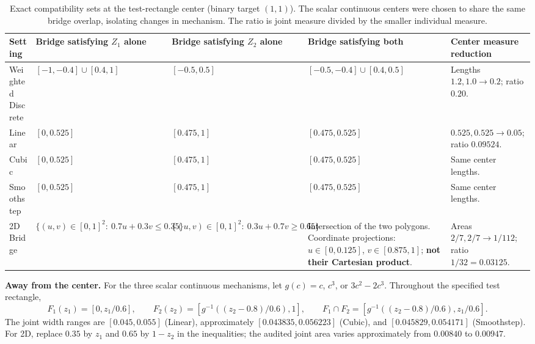 \documentclass[11pt]{article}
\begin{document}
\begin{table}[h!]
\centering\small\renewcommand{\arraystretch}{1.5}
\begin{tabular}{p{25mm}p{50mm}p{50mm}p{58mm}p{41mm}}
\toprule
Setting & Bridge satisfying $Z_1$ alone & Bridge satisfying $Z_2$ alone & Bridge satisfying both & Center measure reduction \\
\midrule
Weighted Discrete & $[-1,-0.4]\cup[0.4,1]$ & $[-0.5,0.5]$ & $[-0.5,-0.4]\cup[0.4,0.5]$ & Lengths $1.2,1.0\to0.2$; ratio $0.20$. \\
Linear & $[0,0.525]$ & $[0.475,1]$ & $[0.475,0.525]$ & $0.525,0.525\to0.05$; ratio $0.09524$. \\
Cubic & $[0,0.525]$ & $[0.475,1]$ & $[0.475,0.525]$ & Same center lengths. \\
Smoothstep & $[0,0.525]$ & $[0.475,1]$ & $[0.475,0.525]$ & Same center lengths. \\
2D Bridge & $\{(u,v)\in[0,1]^2:\ 0.7u+0.3v\leq0.35\}$ & $\{(u,v)\in[0,1]^2:\ 0.3u+0.7v\geq0.65\}$ & Intersection of the two polygons. Coordinate projections: $u\in[0,0.125]$, $v\in[0.875,1]$; \textbf{not their Cartesian product}. & Areas $2/7,2/7\to1/112$; ratio $1/32=0.03125$. \\
\bottomrule
\end{tabular}
\caption{Exact compatibility sets at the test-rectangle center (binary target $(1,1)$). The scalar continuous centers were chosen to share the same bridge overlap, isolating changes in mechanism. The ratio is joint measure divided by the smaller individual measure.}
\end{table}

\textbf{Away from the center.} For the three scalar continuous mechanisms, let $g(c)=c$, $c^3$, or $3c^2-2c^3$. Throughout the specified test rectangle,
\[
F_1(z_1)=[0,z_1/0.6],\qquad
F_2(z_2)=[g^{-1}((z_2-0.8)/0.6),1],\qquad
F_1\cap F_2=[g^{-1}((z_2-0.8)/0.6),z_1/0.6].
\]
The joint width ranges are $[0.045,0.055]$ (Linear), approximately $[0.043835,0.056223]$ (Cubic), and $[0.045829,0.054171]$ (Smoothstep). For 2D, replace $0.35$ by $z_1$ and $0.65$ by $1-z_2$ in the inequalities; the audited joint area varies approximately from $0.00840$ to $0.00947$.
\end{document}
